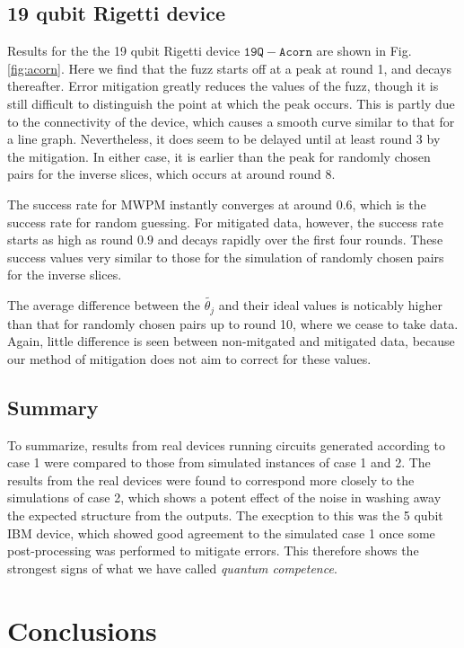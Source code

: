 \documentclass[aps,prl,twocolumn,showpacs,preprintnumbers]{revtex4-1}
\begin{document}
\subsection{19 qubit Rigetti device}  \label{subsec:acorn}

Results for the the 19 qubit Rigetti device $\mathtt{19Q-Acorn}$ are shown in Fig. \ref{fig:acorn}. Here we find that the fuzz starts off at a peak at round 1, and decays thereafter. Error mitigation greatly reduces the values of the fuzz, though it is still difficult to distinguish the point at which the peak occurs. This is partly due to the connectivity of the device, which causes a smooth curve similar to that for a line graph. Nevertheless, it does seem to be delayed until at least round 3 by the mitigation. In either case, it is earlier than the peak for randomly chosen pairs for the inverse slices, which occurs at around round 8.

The success rate for MWPM instantly converges at around $0.6$, which is the success rate for random guessing. For mitigated data, however, the success rate starts as high as round $0.9$ and decays rapidly over the first four rounds. These success values very similar to those for the simulation of randomly chosen pairs for the inverse slices.

The average difference between the $\tilde{\theta_j}$ and their ideal values is noticably higher than that for randomly chosen pairs up to round 10, where we cease to take data. Again, little difference is seen between non-mitgated and mitigated data, because our method of mitigation does not aim to correct for these values.

\subsection{Summary}

To summarize, results from real devices running circuits generated according to case 1 were compared to those from simulated instances of case 1 and 2. The results from the real devices were found to correspond more closely to the simulations of case 2, which shows a potent effect of the noise in washing away the expected structure from the outputs. The execption to this was the 5 qubit IBM device, which showed good agreement to the simulated case 1 once some post-processing was performed to mitigate errors. This therefore shows the strongest signs of what we have called \textit{quantum competence}.


\section{Conclusions}
\end{document}
